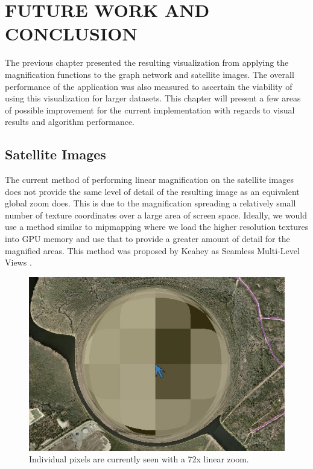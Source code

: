 
 
\chapter{FUTURE WORK AND CONCLUSION}
\label{chapter:future_work}

The previous chapter presented the resulting visualization from applying the magnification functions to the graph network and satellite images. The overall performance of the application was also measured to ascertain the viability of using this visualization for larger datasets. This chapter will present a few areas of possible improvement for the current implementation with regards to visual results and algorithm performance.

\section{Satellite Images}
\label{section:future_satellite_images}

The current method of performing linear magnification on the satellite images does not provide the same level of detail of the resulting image as an equivalent global zoom does. This is due to the magnification spreading a relatively small number of texture coordinates over a large area of screen space. Ideally, we would use a method similar to mipmapping where we load the higher resolution textures into GPU memory and use that to provide a greater amount of detail for the magnified
areas. This method was proposed by Keahey as Seamless Multi-Level Views \cite{Keahey1998}.

\begin{figure} \centering
    \includegraphics[width=0.50\linewidth]{img/artifacts_clipped.jpg}
    \caption[Satellite Image Magnification Artifacts]{Individual pixels are currently seen with a 72x linear zoom.}
    \label{fig:artifacts_clipped}
\end{figure}

